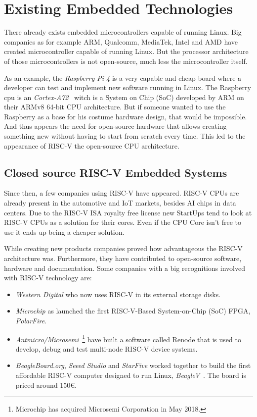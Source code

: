 \chapter{Existing Embedded Technologies}
There already exists embedded microcontrollers capable of running Linux. Big companies as for example ARM, Qualcomm, MediaTek, Intel and AMD have created microcontroller capable of running Linux. But the processor architecture of those microcontrollers is not open-source, much less the microcontroller itself. 

As an example, the \textit{Raspberry Pi 4} is a very capable and cheap board where a developer can test and implement new software running in Linux. The Raspberry \acrshort{cpu} is an \textit{Cortex-A72}~\cite{cortex_a72} witch is a System on Chip (SoC) developed by ARM on their ARMv8 64-bit CPU architecture. But if someone wanted to use the Raspberry as a base for his costume hardware design, that would be impossible. And thus appears the need for open-source hardware that allows creating something new without having to start from scratch every time. This led to the appearance of RISC-V the open-source CPU architecture.


\section{Closed source RISC-V Embedded Systems}
Since then, a few companies using RISC-V have appeared. RISC-V CPUs are already present in the automotive and IoT markets, besides AI chips in data centers. Due to the RISC-V ISA royalty free license new StartUps tend to look at RISC-V CPUs as a solution for their cores. Even if the CPU Core isn't free to use it ends up being a cheaper solution.

While creating new products companies proved how advantageous the RISC-V architecture was. Furthermore, they have contributed to open-source software, hardware and documentation. Some companies with a big recognitions involved with RISC-V technology are:
\begin{itemize}
    \item \textit{Western Digital} who now uses RISC-V in its external storage disks. 
    \item \textit{Microchip} as launched the first RISC-V-Based System-on-Chip (SoC) FPGA, \textit{PolarFire}. 
    \item \textit{Antmicro/Microsemi}~\footnote{Microchip has acquired Microsemi Corporation in May 2018.} have built a software called Renode that is used to develop, debug and test multi-node RISC-V device systems.
    \item \textit{BeagleBoard.org}, \textit{Seeed Studio} and \textit{StarFive} worked together to build the first affordable RISC-V computer designed to run Linux, \textit{BeagleV}~\cite{beagleV}. The board is priced around 150€.
\end{itemize}

